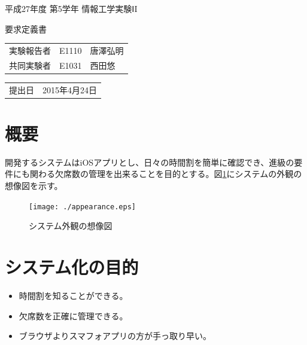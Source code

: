 \documentclass[a4paper,11pt]{jsarticle}
\begin{document}
平成27年度 第5学年 情報工学実験ⅠI

\vspace{0.5in}

\begin{center}
\Huge
要求定義書

\vspace{2in}

\begin{table}[htbp]
\centering
\begin{tabular}{lll}
実験報告者 & E1110 & 唐澤弘明 \\
共同実験者 & E1031 & 西田悠 \\

\end{tabular}
\end{table}

\vspace{0.5in}

\begin{table}[htbp]
\centering
\begin{tabular}{ll}
提出日 & 2015年4月24日 \\
\end{tabular}
\end{table}
\end{center}


\setcounter{page}{0}
\thispagestyle{empty}
\newpage

\section{概要}
開発するシステムはiOSアプリとし、日々の時間割を簡単に確認でき、進級の要件にも関わる欠席数の管理を出来ることを目的とする。図\ref{img:appearance}にシステムの外観の想像図を示す。

\begin{figure}[htbp]
\centering
\texttt{[image: ./appearance.eps]}
\caption{システム外観の想像図 \label{img:appearance}}
\end{figure}


\section{システム化の目的}

\begin{itemize}
\item 時間割を知ることができる。
\item 欠席数を正確に管理できる。
\item ブラウザよりスマフォアプリの方が手っ取り早い。
\end{itemize}
\end{document}

